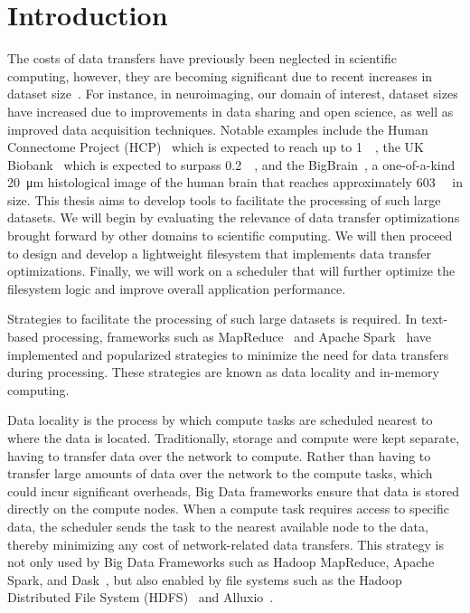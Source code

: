\documentclass{report}
\begin{document}
    \chapter{Introduction}

    The costs of data transfers
    have previously been neglected in scientific computing, however, they are becoming significant
    due to recent increases in dataset size~\cite{vanhorn2014}. For instance, in neuroimaging,
    our domain of interest, dataset sizes have increased due to improvements in data sharing and open science, as
    well as improved data acquisition techniques. Notable examples include the Human Connectome
    Project (HCP)~\cite{hcp} which is expected to reach up to \SI{1}{\peta\byte}, the UK Biobank~\cite{ukbio} which is
    expected to surpass \SI{0.2}{\peta\byte}, and the BigBrain~\cite{bigbrain}, a one-of-a-kind \SI{20}{\micro\meter}
    histological image of the human brain that reaches approximately \SI{603}{\giga\byte} in size.
    This thesis aims to develop tools to facilitate the processing of such large datasets.
    We will begin by evaluating the relevance of data transfer optimizations brought forward by other
    domains to scientific computing. We will then proceed to design and develop a lightweight
    filesystem that implements data transfer optimizations. Finally, we will work on a scheduler
    that will further optimize the filesystem logic and improve overall application performance.
    
    Strategies to facilitate the processing of such large datasets is required. In text-based
    processing, frameworks such as MapReduce~\cite{mapreduce} and Apache Spark~\cite{spark}
    have implemented and popularized strategies to minimize the need for data transfers during processing.
    These strategies are known as data locality and in-memory computing.

    Data locality is the process by which compute tasks are scheduled nearest to where
    the data is located. Traditionally, storage and compute were kept separate,
    having to transfer data over the network to compute. Rather than having to transfer large amounts of data over the
    network to the compute tasks, which could incur significant overheads, Big Data frameworks ensure that data is
    stored directly on the compute nodes. When a compute task requires access to specific
    data, the scheduler sends the task to the nearest available node to the data, thereby
    minimizing any cost of network-related data transfers. This strategy is not only
    used by Big Data Frameworks such as Hadoop MapReduce, Apache Spark, and Dask~\cite{dask},
    but also enabled by file systems such as the Hadoop Distributed File System (HDFS)~\cite{hdfs}
    and Alluxio~\cite{alluxio}.
\end{document}
